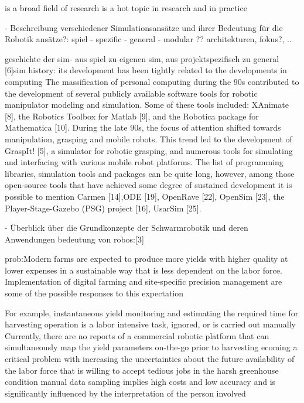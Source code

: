 \documentclass[german,version-2020-11]{uzl-thesis}
\begin{document}
    is a broad field of research
    is a hot topic in research and in practice



- Beschreibung verschiedener Simulationsansätze und ihrer Bedeutung für die Robotik
    ansätze?: spiel - spezific - general - modular ??
      architekturen, fokus?, ..

    geschichte der sim- aus spiel zu eigenen sim, aus projektspezifisch zu general
    [6]sim history:
      its development has been tightly related to the developments in computing
      The massification of personal computing during the 90s contributed to the development of several publicly available software tools for robotic manipulator 
	modeling and simulation. Some of these tools included: XAnimate [8], the Robotics Toolbox for Matlab [9], and the Robotica package for Mathematica [10]. 
      During the late 90s, the focus of attention shifted towards manipulation, grasping and mobile robots. 
	This trend led to the development of GraspIt! [5], a simulator for robotic grasping, and numerous tools for simulating and interfacing with various mobile robot platforms. 
	The list of programming libraries, simulation tools and packages can be quite long, however, among those open-source tools that have achieved some degree of sustained development it is 	possible to mention Carmen [14],ODE [19], OpenRave [22], OpenSim [23], the Player-Stage-Gazebo (PSG) project [16], UsarSim [25]. 



- Überblick über die Grundkonzepte der Schwarmrobotik und deren Anwendungen
bedeutung von robos:[3]
		
prob:Modern farms are expected to produce more yields with higher quality at lower expenses in a sustainable way that is less dependent on the labor force. Implementation of digital farming and site-specific precision management are some of the possible responses to this expectation

For example,  instantaneous yield monitoring and estimating the required time for harvesting operation is a labor intensive task, ignored, or is carried out manually
Currently, there are no reports of a commercial robotic platform that can simultaneously map the yield parameters on-the-go prior to harvesting
ecoming a critical problem with increasing the uncertainties about the future availability of the labor force that is willing to accept tedious jobs in the harsh greenhouse condition
manual data sampling implies high costs and low accuracy and is significantly influenced by the interpretation of the person involved
\end{document}
